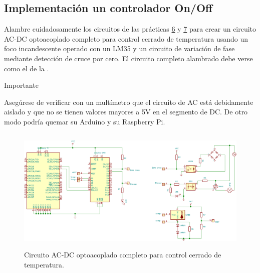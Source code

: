 %
%


\subsection{Implementación un controlador On/Off}%
\label{sec:step-1}

Alambre cuidadosamente los circuitos de las prácticas \href{https://github.com/kyordhel/FSEm/tree/master/practica06}{6} y \href{https://github.com/kyordhel/FSEm/tree/master/practica07}{7} para crear un circuito AC-DC optoacoplado completo para control cerrado de temperatura usando un foco incandescente operado con un LM35 y un circuito de variación de fase mediante detección de cruce por cero.
El circuito completo alambrado debe verse como el de la .

\medskip

\begin{importantbox}{\large Importante}
	\begin{center}
		Asegúrese de verificar con un multímetro que el circuito de AC está debidamente aislado y que no se tienen valores mayores a 5V en el segmento de DC.
		De otro modo podría quemar su Arduino y su Raspberry Pi.
	\end{center}
\end{importantbox}

\medskip

\begin{figure}
	\centering
	\includegraphics[width=0.85\linewidth,height=6cm,keepaspectratio]{img/circuit-full.png}
	\caption{Circuito AC-DC optoacoplado completo para control cerrado de temperatura.}%
	\label{fig:circuit-full}
\end{figure}

